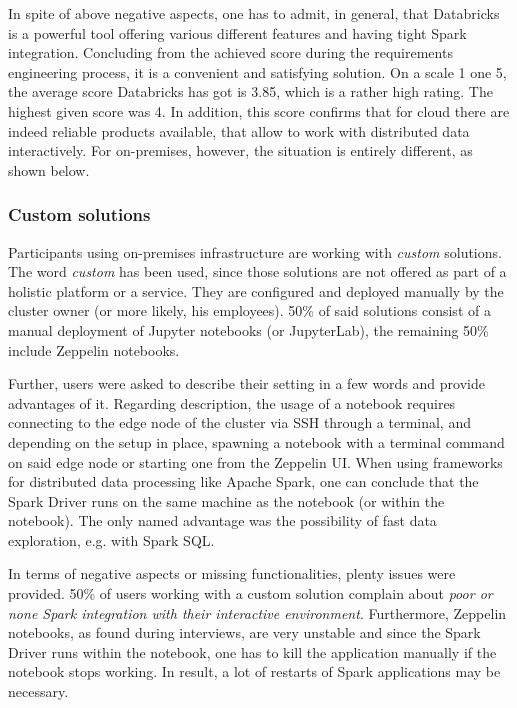 \documentclass[a4paper,twoside]{article}
\begin{document}
In spite of above negative aspects, one has to admit, in general, that Databricks is a powerful tool offering various different features and having tight Spark integration. Concluding from the achieved score during the requirements engineering process, it is a convenient and satisfying solution. On a scale 1 one 5, the average score Databricks has got is 3.85, which is a rather high rating. The highest given score was 4. In addition, this score confirms that for cloud there are indeed reliable products available, that allow to work with distributed data interactively. For on-premises, however, the situation is entirely different, as shown below. 

\subsubsection{Custom solutions}

Participants using on-premises infrastructure are working with \textit{custom} solutions. The word \textit{custom} has been used, since those solutions are not offered as part of a holistic platform or a service. They are configured and deployed manually by the cluster owner (or more likely, his employees). 50\% of said solutions consist of a manual deployment of Jupyter notebooks (or JupyterLab), the remaining 50\% include Zeppelin notebooks. 

Further, users were asked to describe their setting in a few words and provide advantages of it. Regarding description, the usage of a notebook requires connecting to the edge node
of the cluster via SSH through a terminal, and depending on the setup in place, spawning a notebook with a terminal command on said edge node or starting one from the Zeppelin UI. When using frameworks for distributed data processing like Apache Spark, one can conclude that the Spark Driver runs on the same machine as the notebook (or within the notebook). The only named advantage was the possibility of fast data exploration, e.g. with Spark SQL.

In terms of negative aspects or missing functionalities, plenty issues were provided. 50\% of users working with a custom solution complain about \textit{poor or none Spark integration with their interactive environment}. Furthermore, Zeppelin notebooks, as found during interviews, are very unstable and since the Spark Driver runs within the notebook, one has to kill the application manually if the notebook stops working. In result, a lot of restarts of Spark applications may be necessary.
\end{document}
